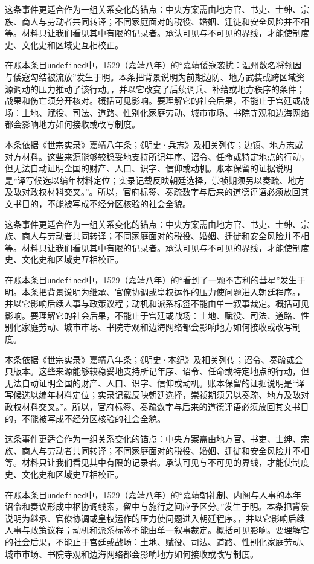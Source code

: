 这条事件更适合作为一组关系变化的锚点：中央方案需由地方官、书吏、士绅、宗族、商人与劳动者共同转译；不同家庭面对的税役、婚姻、迁徙和安全风险并不相等。材料只让我们看见其中有限的记录者。承认可见与不可见的界线，才能使制度史、文化史和区域史互相校正。

在账本条目\texttt{undefined}中，1529（嘉靖八年）的“嘉靖倭寇袭扰：温州数名将领因与倭寇勾结被流放”发生于明。本条把背景说明为前期边防、地方武装或跨区域资源调动的压力推动了该行动。，并以它改变了后续调兵、补给或地方秩序的条件；战果和伤亡须分开核对。概括可见影响。要理解它的社会后果，不能止于宫廷或战场：土地、赋役、司法、道路、性别化家庭劳动、城市市场、书院寺观和边海网络都会影响地方如何接收或改写制度。

本条依据《世宗实录》嘉靖八年条；《明史·兵志》及相关列传；边镇、地方志或对方材料。这些来源能够较稳妥地支持所记年序、诏令、任命或特定地点的行动，但无法自动证明全国的财产、人口、识字、信仰或动机。账本保留的证据说明是“译写候选以编年材料定位；实录记载反映朝廷选择，崇祯期须另以奏疏、地方及敌对政权材料交叉。”。所以，官府标签、奏疏数字与后来的道德评语必须放回其文书目的，不能被写成不经分区核验的社会全貌。

这条事件更适合作为一组关系变化的锚点：中央方案需由地方官、书吏、士绅、宗族、商人与劳动者共同转译；不同家庭面对的税役、婚姻、迁徙和安全风险并不相等。材料只让我们看见其中有限的记录者。承认可见与不可见的界线，才能使制度史、文化史和区域史互相校正。

在账本条目\texttt{undefined}中，1529（嘉靖八年）的“看到了一颗不吉利的彗星”发生于明。本条把背景说明为继承、官僚协调或皇权运作的压力使问题进入朝廷程序。，并以它影响后续人事与政策议程；动机和派系标签不能由单一叙事裁定。概括可见影响。要理解它的社会后果，不能止于宫廷或战场：土地、赋役、司法、道路、性别化家庭劳动、城市市场、书院寺观和边海网络都会影响地方如何接收或改写制度。

本条依据《世宗实录》嘉靖八年条；《明史·本纪》及相关列传；诏令、奏疏或会典版本。这些来源能够较稳妥地支持所记年序、诏令、任命或特定地点的行动，但无法自动证明全国的财产、人口、识字、信仰或动机。账本保留的证据说明是“译写候选以编年材料定位；实录记载反映朝廷选择，崇祯期须另以奏疏、地方及敌对政权材料交叉。”。所以，官府标签、奏疏数字与后来的道德评语必须放回其文书目的，不能被写成不经分区核验的社会全貌。

这条事件更适合作为一组关系变化的锚点：中央方案需由地方官、书吏、士绅、宗族、商人与劳动者共同转译；不同家庭面对的税役、婚姻、迁徙和安全风险并不相等。材料只让我们看见其中有限的记录者。承认可见与不可见的界线，才能使制度史、文化史和区域史互相校正。

在账本条目\texttt{undefined}中，1529（嘉靖八年）的“嘉靖朝礼制、内阁与人事的本年诏令和奏议形成中枢协调线索，留中与施行之间应予区分。”发生于明。本条把背景说明为继承、官僚协调或皇权运作的压力使问题进入朝廷程序。，并以它影响后续人事与政策议程；动机和派系标签不能由单一叙事裁定。概括可见影响。要理解它的社会后果，不能止于宫廷或战场：土地、赋役、司法、道路、性别化家庭劳动、城市市场、书院寺观和边海网络都会影响地方如何接收或改写制度。

